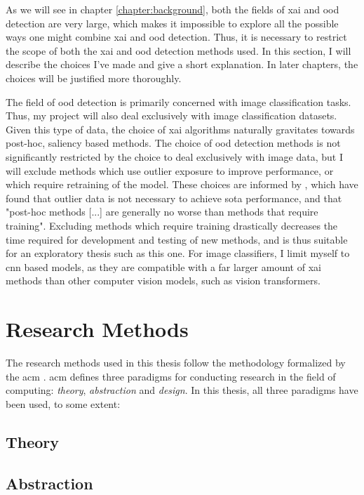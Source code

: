 \documentclass[UKenglish]{uiomasterthesis} %
\theoremstyle{definition}
\begin{document}
As we will see in chapter \ref{chapter:background}, both the fields of \ac{xai} and \ac{ood} detection are very large, which makes it impossible to explore all the possible ways one might combine \ac{xai} and \ac{ood} detection. Thus, it is necessary to restrict the scope of both the \ac{xai} and \ac{ood} detection methods used. In this section, I will describe the choices I've made and give a short explanation. In later chapters, the choices will be justified more thoroughly.

The field of \ac{ood} detection is primarily concerned with image classification tasks. Thus, my project will also deal exclusively with image classification datasets. Given this type of data, the choice of \ac{xai} algorithms naturally gravitates towards post-hoc, saliency based methods. The choice of \ac{ood} detection methods is not significantly restricted by the choice to deal exclusively with image data, but I will exclude methods which use outlier exposure to improve performance, or which require retraining of the model. These choices are informed by \cite{openood}, which have found that outlier data is not necessary to achieve \ac{sota} performance, and that "post-hoc methods [...] are generally no worse than methods that require training". Excluding methods which require training drastically decreases the time required for development and testing of new methods, and is thus suitable for an exploratory thesis such as this one. For image classifiers, I limit myself to \ac{cnn} based models, as they are compatible with a far larger amount of \ac{xai} methods than other computer vision models, such as vision transformers.

\section{Research Methods}

The research methods used in this thesis follow the methodology formalized by the \ac{acm} \cite{acm}. \ac{acm} defines three paradigms for conducting research in the field of computing: {\it theory}, {\it abstraction} and {\it design}. In this thesis, all three paradigms have been used, to some extent:

\subsection{Theory}

\subsection{Abstraction}
\end{document}
